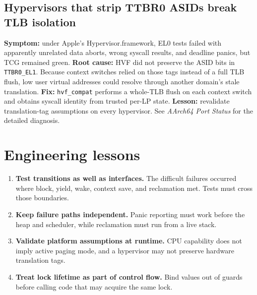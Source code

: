 \subsection{Hypervisors that strip TTBR0 ASIDs break TLB isolation}

\textbf{Symptom:} under Apple's Hypervisor.framework, EL0 tests failed with
apparently unrelated data aborts, wrong syscall results, and deadline panics, but
TCG remained green. \textbf{Root cause:} HVF did not preserve the ASID bits in
\texttt{TTBR0\_EL1}. Because context switches relied on those tags instead of a
full TLB flush, low user virtual addresses could resolve through another domain's
stale translation. \textbf{Fix:} \texttt{hvf\_compat} performs a whole-TLB flush
on each context switch and obtains syscall identity from trusted per-LP state.
\textbf{Lesson:} revalidate translation-tag assumptions on every hypervisor. See
\emph{AArch64 Port Status} for the detailed diagnosis.

\section{Engineering lessons}

\begin{enumerate}
    \item \textbf{Test transitions as well as interfaces.} The difficult failures
        occurred where block, yield, wake, context save, and reclamation met.
        Tests must cross those boundaries.

    \item \textbf{Keep failure paths independent.} Panic reporting must work
        before the heap and scheduler, while reclamation must run from a live stack.

    \item \textbf{Validate platform assumptions at runtime.} CPU capability does
        not imply active paging mode, and a hypervisor may not preserve hardware
        translation tags.

    \item \textbf{Treat lock lifetime as part of control flow.} Bind values out of
        guards before calling code that may acquire the same lock.
\end{enumerate}

\endinput
